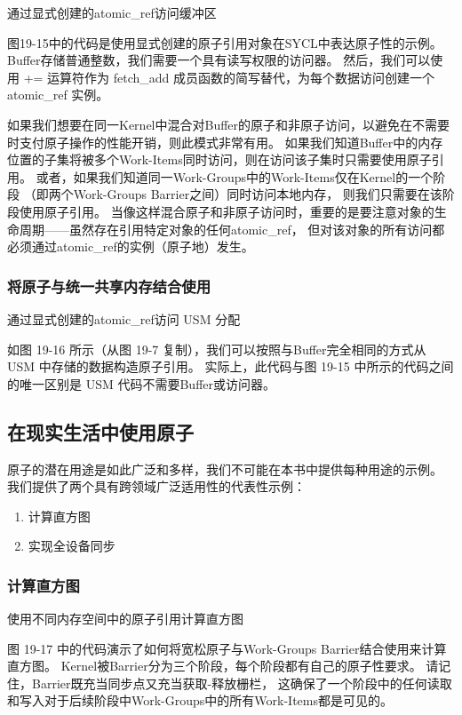 {\color{red} 通过显式创建的atomic\_ref访问缓冲区}

图19-15中的代码是使用显式创建的原子引用对象在SYCL中表达原子性的示例。 
Buffer存储普通整数，我们需要一个具有读写权限的访问器。 
然后，我们可以使用 += 运算符作为 fetch\_add 成员函数的简写替代，为每个数据访问创建一个atomic\_ref 实例。

如果我们想要在同一Kernel中混合对Buffer的原子和非原子访问，以避免在不需要时支付原子操作的性能开销，则此模式非常有用。 
如果我们知道Buffer中的内存位置的子集将被多个Work-Items同时访问，则在访问该子集时只需要使用原子引用。 
或者，如果我们知道同一Work-Groups中的Work-Items仅在Kernel的一个阶段
（即两个Work-Groups Barrier之间）同时访问本地内存，
则我们只需要在该阶段使用原子引用。 
当像这样混合原子和非原子访问时，重要的是要注意对象的生命周期——虽然存在引用特定对象的任何atomic\_ref，
但对该对象的所有访问都必须通过atomic\_ref的实例（原子地）发生。

\subsubsection{将原子与统一共享内存结合使用}
{\color{red} 通过显式创建的atomic\_ref访问 USM 分配}

如图 19-16 所示（从图 19-7 复制），我们可以按照与Buffer完全相同的方式从 USM 中存储的数据构造原子引用。 
实际上，此代码与图 19-15 中所示的代码之间的唯一区别是 USM 代码不需要Buffer或访问器。

\subsection{在现实生活中使用原子}
原子的潜在用途是如此广泛和多样，我们不可能在本书中提供每种用途的示例。 
我们提供了两个具有跨领域广泛适用性的代表性示例：

\begin{enumerate}
	\item 计算直方图

	\item 实现全设备同步
\end{enumerate}

\subsubsection{计算直方图}
{\color{red} 使用不同内存空间中的原子引用计算直方图}

图 19-17 中的代码演示了如何将宽松原子与Work-Groups Barrier结合使用来计算直方图。 
Kernel被Barrier分为三个阶段，每个阶段都有自己的原子性要求。 
请记住，Barrier既充当同步点又充当获取-释放栅栏，
这确保了一个阶段中的任何读取和写入对于后续阶段中Work-Groups中的所有Work-Items都是可见的。

